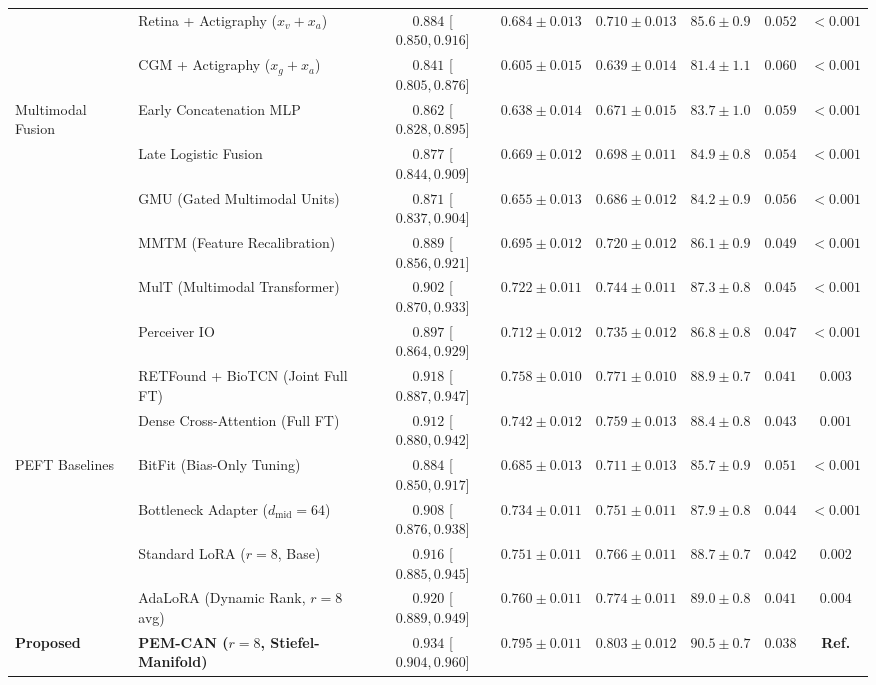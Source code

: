 \documentclass[a4paper,fleqn]{cas-dc}
\begin{document}
\begin{table}[t]
{\begin{tabular}{llcccccc}
& Retina + Actigraphy ($x_v + x_a$) & $0.884$ [$0.850, 0.916$] & $0.684 \pm 0.013$ & $0.710 \pm 0.013$ & $85.6 \pm 0.9$ & $0.052$ & $<0.001$ \\
& CGM + Actigraphy ($x_g + x_a$) & $0.841$ [$0.805, 0.876$] & $0.605 \pm 0.015$ & $0.639 \pm 0.014$ & $81.4 \pm 1.1$ & $0.060$ & $<0.001$ \\
\midrule
\multirow{7}{*}{Multimodal Fusion} 
& Early Concatenation MLP & $0.862$ [$0.828, 0.895$] & $0.638 \pm 0.014$ & $0.671 \pm 0.015$ & $83.7 \pm 1.0$ & $0.059$ & $<0.001$ \\
& Late Logistic Fusion & $0.877$ [$0.844, 0.909$] & $0.669 \pm 0.012$ & $0.698 \pm 0.011$ & $84.9 \pm 0.8$ & $0.054$ & $<0.001$ \\
& GMU (Gated Multimodal Units)~\cite{arevalo2017gmu} & $0.871$ [$0.837, 0.904$] & $0.655 \pm 0.013$ & $0.686 \pm 0.012$ & $84.2 \pm 0.9$ & $0.056$ & $<0.001$ \\
& MMTM (Feature Recalibration)~\cite{joze2020mmtm} & $0.889$ [$0.856, 0.921$] & $0.695 \pm 0.012$ & $0.720 \pm 0.012$ & $86.1 \pm 0.9$ & $0.049$ & $<0.001$ \\
& MulT (Multimodal Transformer)~\cite{tsai2019mult} & $0.902$ [$0.870, 0.933$] & $0.722 \pm 0.011$ & $0.744 \pm 0.011$ & $87.3 \pm 0.8$ & $0.045$ & $<0.001$ \\
& Perceiver IO~\cite{jaegle2021perceiver} & $0.897$ [$0.864, 0.929$] & $0.712 \pm 0.012$ & $0.735 \pm 0.012$ & $86.8 \pm 0.8$ & $0.047$ & $<0.001$ \\
& RETFound + BioTCN (Joint Full FT)~\cite{zhou2023retfound} & $0.918$ [$0.887, 0.947$] & $0.758 \pm 0.010$ & $0.771 \pm 0.010$ & $88.9 \pm 0.7$ & $0.041$ & $0.003$ \\
& Dense Cross-Attention (Full FT) & $0.912$ [$0.880, 0.942$] & $0.742 \pm 0.012$ & $0.759 \pm 0.013$ & $88.4 \pm 0.8$ & $0.043$ & $0.001$ \\
\midrule
\multirow{4}{*}{PEFT Baselines} 
& BitFit (Bias-Only Tuning)~\cite{zaken2022bitfit} & $0.884$ [$0.850, 0.917$] & $0.685 \pm 0.013$ & $0.711 \pm 0.013$ & $85.7 \pm 0.9$ & $0.051$ & $<0.001$ \\
& Bottleneck Adapter ($d_{\text{mid}}=64$)~\cite{houlsby2019parameter} & $0.908$ [$0.876, 0.938$] & $0.734 \pm 0.011$ & $0.751 \pm 0.011$ & $87.9 \pm 0.8$ & $0.044$ & $<0.001$ \\
& Standard LoRA ($r=8$, Base)~\cite{hu2022lora} & $0.916$ [$0.885, 0.945$] & $0.751 \pm 0.011$ & $0.766 \pm 0.011$ & $88.7 \pm 0.7$ & $0.042$ & $0.002$ \\
& AdaLoRA (Dynamic Rank, $r=8$ avg)~\cite{zhang2023adalora} & $0.920$ [$0.889, 0.949$] & $0.760 \pm 0.011$ & $0.774 \pm 0.011$ & $89.0 \pm 0.8$ & $0.041$ & $0.004$ \\
\midrule
\rowcolor{green!10}
\textbf{Proposed} & \textbf{PEM-CAN ($r=8$, Stiefel-Manifold)} & $\mathbf{0.934}$ [$\mathbf{0.904, 0.960}$] & $\mathbf{0.795 \pm 0.011}$ & $\mathbf{0.803 \pm 0.012}$ & $\mathbf{90.5 \pm 0.7}$ & $\mathbf{0.038}$ & \textbf{Ref.} \\
\bottomrule
\end{tabular}
}
\end{table}
\end{document}
